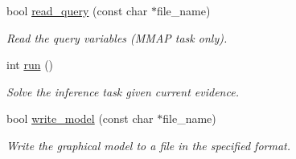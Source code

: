\begin{DoxyCompactItemize}
bool \hyperlink{classMerlin_a8f4ac13e2544692d12548091929d09b0}{read\+\_\+query} (const char $\ast$file\+\_\+name)
\begin{DoxyCompactList}\small\item\em Read the query variables (M\+M\+AP task only). \end{DoxyCompactList}\item 
int \hyperlink{classMerlin_a5c26ff2b1f8471e270790b1611984c70}{run} ()
\begin{DoxyCompactList}\small\item\em Solve the inference task given current evidence. \end{DoxyCompactList}\item 
bool \hyperlink{classMerlin_a7c221d661b35a234e4141933346d1797}{write\+\_\+model} (const char $\ast$file\+\_\+name)
\begin{DoxyCompactList}\small\item\em Write the graphical model to a file in the specified format. \end{DoxyCompactList}\end{DoxyCompactItemize}
